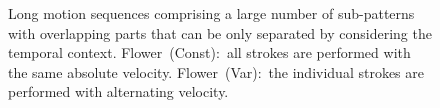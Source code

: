 \documentclass[twoside,11pt]{article}
\begin{document}
\begin{figure}
	\vspace{\vsep}


\caption{Long motion sequences comprising a large number of sub-patterns with overlapping parts that can be only separated by considering the temporal context. Flower~(Const):~all strokes are performed with the same absolute velocity. Flower~(Var):~the individual strokes are performed with alternating velocity.}
\end{figure}

%
%
%
%
%
%
%
%
%
%
%
%
%
%
%
%
%
%
%
%
%
%
%
%
%
%
%
%
%
%
%
%
%
%
%
%
%
%
%
%
%
%
%
%
%
%
%
\FloatBarrier
\newpage

\end{document}
